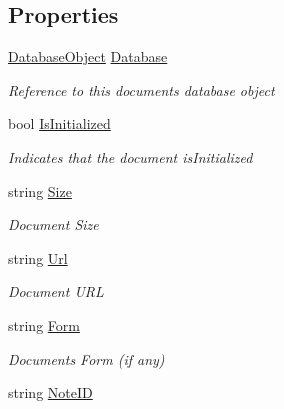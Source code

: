 \subsection*{Properties}
\begin{DoxyCompactItemize}
\item 
\mbox{\hyperlink{class_database_object}{Database\+Object}} \mbox{\hyperlink{class_document_object_a69d5338c9835f748490323d2950eed09}{Database}}
\begin{DoxyCompactList}\small\item\em Reference to this documents database object \end{DoxyCompactList}\item 
bool \mbox{\hyperlink{class_document_object_a3b2075b73f38d05091b69decc6ce7992}{Is\+Initialized}}
\begin{DoxyCompactList}\small\item\em Indicates that the document is\+Initialized \end{DoxyCompactList}\item 
string \mbox{\hyperlink{class_document_object_abdc1a6dfc1bb2261b523cf94468448b9}{Size}}
\begin{DoxyCompactList}\small\item\em Document Size \end{DoxyCompactList}\item 
string \mbox{\hyperlink{class_document_object_ac86b730cf8931b2221af577d32ca2f31}{Url}}
\begin{DoxyCompactList}\small\item\em Document U\+RL \end{DoxyCompactList}\item 
string \mbox{\hyperlink{class_document_object_ad3444a6c018474405064070fa9a94afe}{Form}}
\begin{DoxyCompactList}\small\item\em Documents Form (if any) \end{DoxyCompactList}\item 
string \mbox{\hyperlink{class_document_object_ac447461e3dc7f8258695f902ef0758a7}{Note\+ID}}

\end{DoxyCompactItemize}
